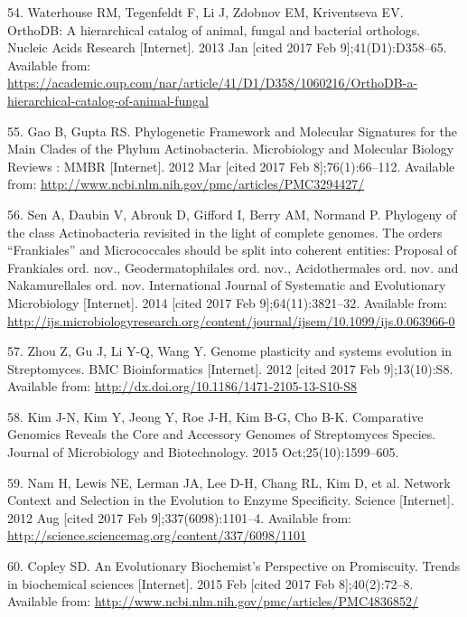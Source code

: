 \documentclass[12pt,twoside]{reedthesis}
\begin{document}
  \hypertarget{ref-waterhouse_orthodb_2013}{}
  54. Waterhouse RM, Tegenfeldt F, Li J, Zdobnov EM, Kriventseva EV.
  OrthoDB: A hierarchical catalog of animal, fungal and bacterial
  orthologs. Nucleic Acids Research {[}Internet{]}. 2013 Jan {[}cited 2017
  Feb 9{]};41(D1):D358--65. Available from:
  \url{https://academic.oup.com/nar/article/41/D1/D358/1060216/OrthoDB-a-hierarchical-catalog-of-animal-fungal}
  
  \hypertarget{ref-gao_phylogenetic_2012}{}
  55. Gao B, Gupta RS. Phylogenetic Framework and Molecular Signatures for
  the Main Clades of the Phylum Actinobacteria. Microbiology and Molecular
  Biology Reviews : MMBR {[}Internet{]}. 2012 Mar {[}cited 2017 Feb
  8{]};76(1):66--112. Available from:
  \url{http://www.ncbi.nlm.nih.gov/pmc/articles/PMC3294427/}
  
  \hypertarget{ref-sen_phylogeny_2014}{}
  56. Sen A, Daubin V, Abrouk D, Gifford I, Berry AM, Normand P. Phylogeny
  of the class Actinobacteria revisited in the light of complete genomes.
  The orders ``Frankiales'' and Micrococcales should be split into
  coherent entities: Proposal of Frankiales ord. nov., Geodermatophilales
  ord. nov., Acidothermales ord. nov. and Nakamurellales ord. nov.
  International Journal of Systematic and Evolutionary Microbiology
  {[}Internet{]}. 2014 {[}cited 2017 Feb 9{]};64(11):3821--32. Available
  from:
  \url{http://ijs.microbiologyresearch.org/content/journal/ijsem/10.1099/ijs.0.063966-0}
  
  \hypertarget{ref-zhou_genome_2012}{}
  57. Zhou Z, Gu J, Li Y-Q, Wang Y. Genome plasticity and systems
  evolution in Streptomyces. BMC Bioinformatics {[}Internet{]}. 2012
  {[}cited 2017 Feb 9{]};13(10):S8. Available from:
  \url{http://dx.doi.org/10.1186/1471-2105-13-S10-S8}
  
  \hypertarget{ref-kim_comparative_2015}{}
  58. Kim J-N, Kim Y, Jeong Y, Roe J-H, Kim B-G, Cho B-K. Comparative
  Genomics Reveals the Core and Accessory Genomes of Streptomyces Species.
  Journal of Microbiology and Biotechnology. 2015 Oct;25(10):1599--605.
  
  \hypertarget{ref-nam_network_2012}{}
  59. Nam H, Lewis NE, Lerman JA, Lee D-H, Chang RL, Kim D, et al. Network
  Context and Selection in the Evolution to Enzyme Specificity. Science
  {[}Internet{]}. 2012 Aug {[}cited 2017 Feb 9{]};337(6098):1101--4.
  Available from:
  \url{http://science.sciencemag.org/content/337/6098/1101}
  
  \hypertarget{ref-copley_evolutionary_2015}{}
  60. Copley SD. An Evolutionary Biochemist's Perspective on Promiscuity.
  Trends in biochemical sciences {[}Internet{]}. 2015 Feb {[}cited 2017
  Feb 8{]};40(2):72--8. Available from:
  \url{http://www.ncbi.nlm.nih.gov/pmc/articles/PMC4836852/}
  
\end{document}
